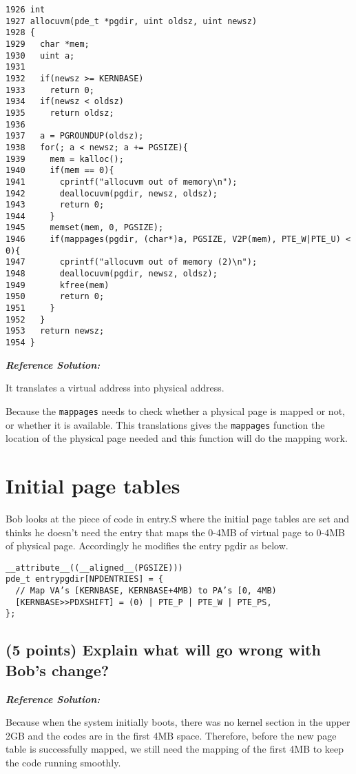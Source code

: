 \documentclass[]{article}
\begin{document}
\begin{verbatim}
1926 int
1927 allocuvm(pde_t *pgdir, uint oldsz, uint newsz)
1928 {
1929   char *mem;
1930   uint a;
1931
1932   if(newsz >= KERNBASE)
1933     return 0;
1934   if(newsz < oldsz)
1935     return oldsz;
1936
1937   a = PGROUNDUP(oldsz);
1938   for(; a < newsz; a += PGSIZE){
1939     mem = kalloc();
1940     if(mem == 0){
1941       cprintf("allocuvm out of memory\n");
1942       deallocuvm(pgdir, newsz, oldsz);
1943       return 0;
1944     }
1945     memset(mem, 0, PGSIZE);
1946     if(mappages(pgdir, (char*)a, PGSIZE, V2P(mem), PTE_W|PTE_U) < 0){
1947       cprintf("allocuvm out of memory (2)\n");
1948       deallocuvm(pgdir, newsz, oldsz);
1949       kfree(mem)
1950       return 0;
1951     }
1952   }
1953   return newsz;
1954 }
\end{verbatim}

\textbf{\emph{Reference Solution:}}

It translates a virtual address into physical address.

Because the \texttt{mappages} needs to check whether a physical page is
mapped or not, or whether it is available. This translations gives the
\texttt{mappages} function the location of the physical page needed and
this function will do the mapping work.

\hypertarget{initial-page-tables}{%
\section{Initial page tables}\label{initial-page-tables}}

Bob looks at the piece of code in entry.S where the initial page tables
are set and thinks he doesn't need the entry that maps the 0-4MB of
virtual page to 0-4MB of physical page. Accordingly he modifies the
entry pgdir as below.

\begin{verbatim}
__attribute__((__aligned__(PGSIZE)))
pde_t entrypgdir[NPDENTRIES] = {
  // Map VA’s [KERNBASE, KERNBASE+4MB) to PA’s [0, 4MB)
  [KERNBASE>>PDXSHIFT] = (0) | PTE_P | PTE_W | PTE_PS,
};
\end{verbatim}

\hypertarget{points-explain-what-will-go-wrong-with-bobs-change}{%
\subsection{(5 points) Explain what will go wrong with Bob's
change?}\label{points-explain-what-will-go-wrong-with-bobs-change}}

\textbf{\emph{Reference Solution:}}

Because when the system initially boots, there was no kernel section in
the upper 2GB and the codes are in the first 4MB space. Therefore,
before the new page table is successfully mapped, we still need the
mapping of the first 4MB to keep the code running smoothly.
\end{document}
